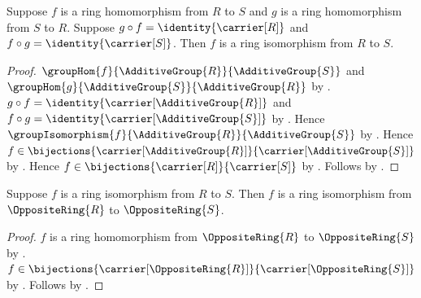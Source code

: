 \begin{theorem}\label{ring_hom_two_sided_inverse_isomorphism}
    Suppose $f$ is a ring homomorphism from $R$ to $S$ and
        $g$ is a ring homomorphism from $S$ to $R$.
    Suppose $g\circ f=\identity{\carrier[R]}$ and
        $f\circ g=\identity{\carrier[S]}$.
    Then $f$ is a ring isomorphism from $R$ to $S$.
\end{theorem}
\begin{proof}
    $\groupHom{f}{\AdditiveGroup{R}}{\AdditiveGroup{S}}$ and
        $\groupHom{g}{\AdditiveGroup{S}}{\AdditiveGroup{R}}$ by
        .
    $g\circ f=\identity{\carrier[\AdditiveGroup{R}]}$ and
        $f\circ g=\identity{\carrier[\AdditiveGroup{S}]}$ by
        .
    Hence $\groupIsomorphism{f}{\AdditiveGroup{R}}{\AdditiveGroup{S}}$ by
        .
    Hence $f\in\bijections{\carrier[\AdditiveGroup{R}]}{
        \carrier[\AdditiveGroup{S}]}$ by
        .
    Hence $f\in\bijections{\carrier[R]}{\carrier[S]}$ by
        .
    Follows by .
\end{proof}

\begin{theorem}\label{ring_isomorphism_between_opposite_rings}
    Suppose $f$ is a ring isomorphism from $R$ to $S$.
    Then $f$ is a ring isomorphism from
        $\OppositeRing{R}$ to $\OppositeRing{S}$.
\end{theorem}
\begin{proof}
    $f$ is a ring homomorphism from
        $\OppositeRing{R}$ to $\OppositeRing{S}$ by
        .
    $f\in\bijections{\carrier[\OppositeRing{R}]}{
        \carrier[\OppositeRing{S}]}$ by
        .
    Follows by .
\end{proof}
